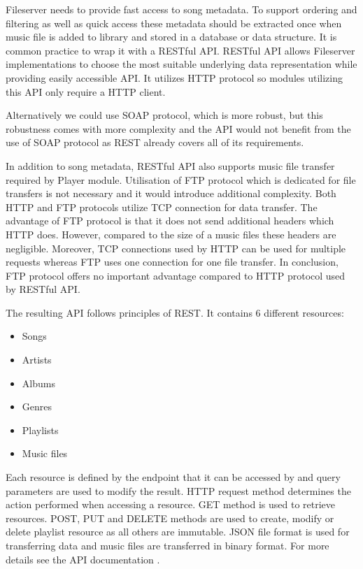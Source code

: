 Fileserver needs to provide fast access to song metadata. To support ordering and filtering as well as quick access these metadata should be extracted once when music file is added to library and stored in a database or data structure. It is common practice to wrap it with a RESTful API. RESTful API allows Fileserver implementations to choose the most suitable underlying data representation while providing easily accessible API. It utilizes HTTP protocol so modules utilizing this API only require a HTTP client.
\par
Alternatively we could use SOAP protocol, which is more robust, but this robustness comes with more complexity and the API would not benefit from the use of SOAP protocol as REST already covers all of its requirements.
\par
In addition to song metadata, RESTful API also supports music file transfer required by Player module. Utilisation of FTP protocol which is dedicated for file transfers is not necessary and it would introduce additional complexity. Both HTTP and FTP protocols utilize TCP connection for data transfer. The advantage of FTP protocol is that it does not send additional headers which HTTP does. However, compared to the size of a music files these headers are negligible. Moreover, TCP connections used by HTTP can be used for multiple requests whereas FTP uses one connection for one file transfer. In conclusion, FTP protocol offers no important advantage compared to HTTP protocol used by RESTful API.
\par
The resulting API follows principles of REST. It contains 6 different resources:
\begin{itemize}
    \item Songs
    \item Artists
    \item Albums
    \item Genres
    \item Playlists
    \item Music files
\end{itemize}
Each resource is defined by the endpoint that it can be accessed by and query parameters are used to modify the result. HTTP request method determines the action performed when accessing a resource. GET method is used to retrieve resources. POST, PUT and DELETE methods are used to create, modify or delete playlist resource as all others are immutable. JSON file format is used for transferring data and music files are transferred in binary format. For more details see the API documentation .

